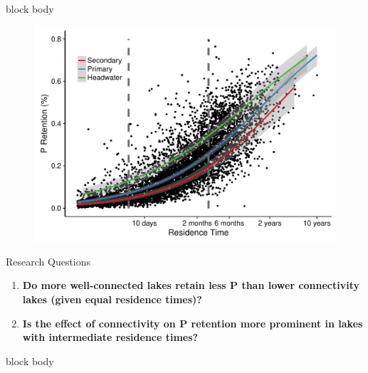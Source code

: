 \documentclass[final,hyperref={pdfpagelabels=false}]{beamer}
\begin{document}
\begin{frame}[t]
\begin{columns}[t]
\begin{column}{.465\textwidth}
{
\begin{beamercolorbox}[wd=\textwidth,rounded=true]{block body}
   \begin{figure}
      \includegraphics[width=\linewidth]{milstead_multi.pdf}
   \end{figure}
\end{beamercolorbox}
}

\vspace{1em}
\begin{block}{Research Questions}

\vspace{1em}

\begin{enumerate} \large 
\item \textbf{Do more well-connected lakes retain less P than lower connectivity lakes (given equal residence times)?}
\vspace{1em}
\item \textbf{Is the effect of connectivity on P retention more prominent in lakes with intermediate residence times?}
\end{enumerate}
\end{block}

{
\begin{beamercolorbox}[wd=\textwidth,rounded=true]{block body}


\end{beamercolorbox}}
\end{column}
\end{columns}
\end{frame}
\end{document}
